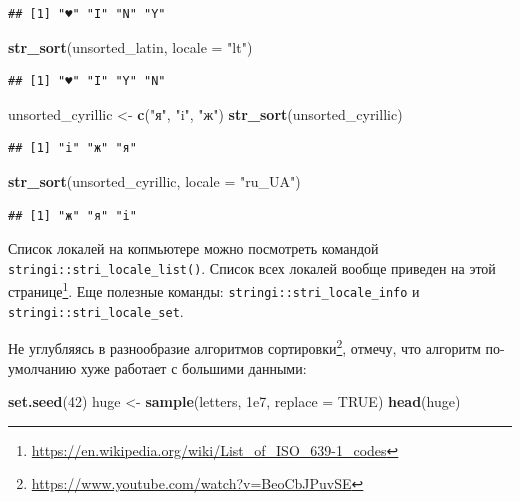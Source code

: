 \documentclass[
]{book}
\newenvironment{Shaded}{\begin{snugshade}}{\end{snugshade}}
\newcommand{\DataTypeTok}[1]{\textcolor[rgb]{0.13,0.29,0.53}{#1}}
\newcommand{\DecValTok}[1]{\textcolor[rgb]{0.00,0.00,0.81}{#1}}
\newcommand{\FloatTok}[1]{\textcolor[rgb]{0.00,0.00,0.81}{#1}}
\newcommand{\KeywordTok}[1]{\textcolor[rgb]{0.13,0.29,0.53}{\textbf{#1}}}
\newcommand{\NormalTok}[1]{#1}
\newcommand{\OtherTok}[1]{\textcolor[rgb]{0.56,0.35,0.01}{#1}}
\newcommand{\StringTok}[1]{\textcolor[rgb]{0.31,0.60,0.02}{#1}}
\renewcommand{\href}[2]{#2\footnote{\url{#1}}}
\begin{document}
\begin{verbatim}
## [1] "♥" "I" "N" "Y"
\end{verbatim}

\begin{Shaded}
\begin{Highlighting}[]
\KeywordTok{str_sort}\NormalTok{(unsorted_latin, }\DataTypeTok{locale =} \StringTok{"lt"}\NormalTok{)}
\end{Highlighting}
\end{Shaded}

\begin{verbatim}
## [1] "♥" "I" "Y" "N"
\end{verbatim}

\begin{Shaded}
\begin{Highlighting}[]
\NormalTok{unsorted_cyrillic <-}\StringTok{ }\KeywordTok{c}\NormalTok{(}\StringTok{"я"}\NormalTok{, }\StringTok{"i"}\NormalTok{, }\StringTok{"ж"}\NormalTok{)}
\KeywordTok{str_sort}\NormalTok{(unsorted_cyrillic)}
\end{Highlighting}
\end{Shaded}

\begin{verbatim}
## [1] "i" "ж" "я"
\end{verbatim}

\begin{Shaded}
\begin{Highlighting}[]
\KeywordTok{str_sort}\NormalTok{(unsorted_cyrillic, }\DataTypeTok{locale =} \StringTok{"ru_UA"}\NormalTok{)}
\end{Highlighting}
\end{Shaded}

\begin{verbatim}
## [1] "ж" "я" "i"
\end{verbatim}

Список локалей на копмьютере можно посмотреть командой \texttt{stringi::stri\_locale\_list()}. Список всех локалей вообще приведен \href{https://en.wikipedia.org/wiki/List_of_ISO_639-1_codes}{на этой странице}. Еще полезные команды: \texttt{stringi::stri\_locale\_info} и \texttt{stringi::stri\_locale\_set}.

Не углубляясь в \href{https://www.youtube.com/watch?v=BeoCbJPuvSE}{разнообразие алгоритмов сортировки}, отмечу, что алгоритм по-умолчанию хуже работает с большими данными:

\begin{Shaded}
\begin{Highlighting}[]
\KeywordTok{set.seed}\NormalTok{(}\DecValTok{42}\NormalTok{)}
\NormalTok{huge <-}\StringTok{ }\KeywordTok{sample}\NormalTok{(letters, }\FloatTok{1e7}\NormalTok{, }\DataTypeTok{replace =} \OtherTok{TRUE}\NormalTok{)}
\KeywordTok{head}\NormalTok{(huge)}
\end{Highlighting}
\end{Shaded}
\end{document}
